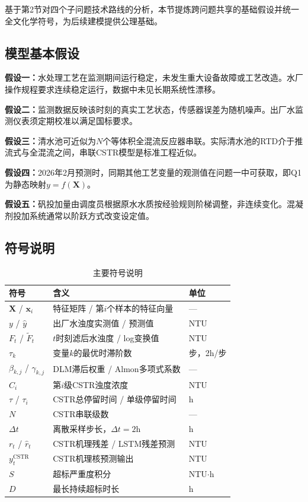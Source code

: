 \documentclass{cumcmthesis}
\begin{document}
基于第2节对四个子问题技术路线的分析，本节提炼跨问题共享的基础假设并统一全文化学符号，为后续建模提供公理基础。

\subsection{模型基本假设}
\textbf{假设一：}水处理工艺在监测期间运行稳定，未发生重大设备故障或工艺改造。水厂操作规程要求连续稳定运行，数据中未见长期系统性漂移。

\textbf{假设二：}监测数据反映该时刻的真实工艺状态，传感器误差为随机噪声。出厂水监测仪表须定期校准以满足国标要求。

\textbf{假设三：}清水池可近似为$N$个等体积全混流反应器串联。实际清水池的RTD介于推流式与全混流之间，串联CSTR模型是标准工程近似\cite{levenspiel}。

\textbf{假设四：}2026年2月预测时，同期其他工艺变量的观测值在问题一中可获取，即Q1为静态映射$y=f(\mathbf{X})$。

\textbf{假设五：}矾投加量由调度员根据原水水质按经验规则阶梯调整，非连续变化。混凝剂投加系统通常以阶跃方式改变设定值。

\subsection{符号说明}
\begin{table}[H]
\centering
\caption{主要符号说明}
\label{tab:symbols}
\begin{tabular}{@{}lll@{}}
\toprule
符号 & 含义 & 单位 \\
\midrule
$\mathbf{X}$ / $\mathbf{x}_i$ & 特征矩阵 / 第$i$个样本的特征向量 & --- \\
$y$ / $\hat{y}$ & 出厂水浊度实测值 / 预测值 & NTU \\
$F_t$ / $\tilde{F}_t$ & $t$时刻滤后水浊度 / log变换值 & NTU \\
$\tau_k$ & 变量$k$的最优时滞阶数 & 步，2h/步 \\
$\beta_{k,j}$ / $\gamma_{k,j}$ & DLM滞后权重 / Almon多项式系数 & --- \\
$C_i$ & 第$i$级CSTR浊度浓度 & NTU \\
$\tau$ / $\tau_i$ & CSTR总停留时间 / 单级停留时间 & h \\
$N$ & CSTR串联级数 & --- \\
$\Delta t$ & 离散采样步长，$\Delta t=2$h & h \\
$r_t$ / $\hat{r}_t$ & CSTR机理残差 / LSTM残差预测 & NTU \\
$y^{\mathrm{CSTR}}_t$ & CSTR机理核预测输出 & NTU \\
$S$ & 超标严重度积分 & NTU$\cdot$h \\
$D$ & 最长持续超标时长 & h \\
\bottomrule
\end{tabular}
\end{table}
\end{document}
